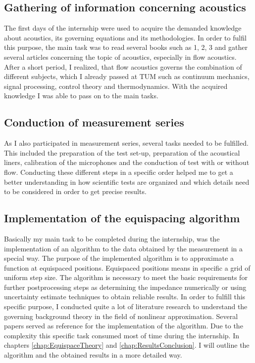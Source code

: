 \documentclass[11pt]{report} %
\begin{document}
\subsection{Gathering of information concerning acoustics } 
The first days of the internship were used to acquire the demanded knowledge about acoustics, its governing equations and its methodologies.
In order to fulfil this purpose, the main task was to read several books such as 1, 2, 3  and gather several articles concerning the topic of acoustics, especially in flow acoustics. 
After a short period, I realized, that flow acoustics governs the combination of different subjects, which I already passed at TUM such as continuum mechanics, signal processing, control theory and thermodynamics.
With the acquired knowledge I was able to pass on to the main tasks. 

\subsection{Conduction of measurement series}
As I also participated in measurement series, several tasks needed to be fulfilled.
This included the preparation of the test set-up, preparation of the acoustical liners, calibration of the microphones and the conduction of test with or without flow.
Conducting these different steps in a specific order helped me to get a better understanding in how scientific tests are organized and which details need to be considered in order to get precise results. 

\subsection{Implementation of the equispacing algorithm}
Basically my main task to be completed during the internship, was the implementation of an algorithm to  the data obtained by the measurement in a special way. 
The purpose of the implemented algorithm is to approximate a function at equispaced positions. 
Equispaced positions means in specific a grid of uniform step size. 
The algorithm is necessary to meet the basic requirements for further postprocessing steps as determining the impedance numerically or using uncertainty estimate techniques to obtain reliable results.  
In order to fulfill this specific purpose, I conducted quite a lot of literature research to understand the governing background theory in the field of nonlinear approximation.
Several papers served as reference for the implementation of the algorithm. 
Due to the complexity this specific task consumed most of time during the internship.
In chapters \ref{chap:EquispaceTheory}  and \ref{chap:ResultsConclusion}. I will outline the algorithm and the obtained results in a more detailed way. 
 
\end{document}
